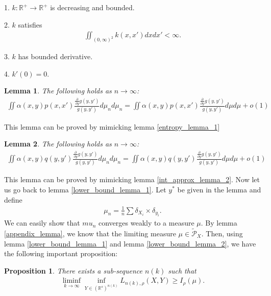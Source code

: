 \documentclass[10pt]{article}
\newtheorem{lemma}{\bf Lemma}
\newtheorem{proposition}{\bf Proposition}
\newenvironment{Proof of lemma}{\noindent{\bf Proof of Lemma}}{\hfill$\Box$\newline}
\newenvironment{Proof of claim}{\noindent{\bf Proof of claim}}{\hfill$\Box$\newline}
\newenvironment{Proof of theorem}{\noindent{\bf Proof of Theorem}}{\hfill\scriptsize{$\Box$}\newline}
\newenvironment{Proof of theorems}{\noindent{\bf Proof of Theorems}}{\hfill$\Box$\newline}
\newenvironment{Proof of proposition}{\noindent{\bf Proof of Proposition}}{\hfill$\Box$\newline}
\newenvironment{Proof of propositions}{\noindent{\bf Proof of Propositions}}{\hfill$\Box$\newline}
\newenvironment{Proof of exercise}{\noindent{\it Proof of Exercise:}}{\hfill$\Box$}
\numberwithin{equation}{section}
\begin{document}
1. $k: \mathbb{R}^+ \to \mathbb{R}^+$ is decreasing and bounded.

2. $k$ satisfies
\begin{align}
    \iint_{(0,\infty)^2} k(x,x') dxdx' < \infty.
\end{align}

3. $k$ has bounded derivative.

4. $k'(0) = 0$.
\begin{lemma} \label{appendix_lemma_1}
    The following holds as $n \to \infty$:
    \begin{align}
        \iint \alpha(x,y)p(x,x') \frac{\frac{\partial}{\partial y}g(y,y')}{g(y,y')} d\mu_n d\mu_n = \iint \alpha(x,y)p(x,x') \frac{\frac{\partial}{\partial y}g(y,y')}{g(y,y')} d\mu d\mu + o(1)
    \end{align}
\end{lemma}
This lemma can be proved by mimicking lemma \ref{entropy_lemma_1}
\begin{lemma} \label{appendix_lemma_2}
    The following holds as $n \to \infty$:
    \begin{align}
        \iint \alpha(x,y)q(y,y') \frac{\frac{\partial}{\partial y}g(y,y')}{g(y,y')} d\mu_n d\mu_n = \iint \alpha(x,y)q(y,y') \frac{\frac{\partial}{\partial y}g(y,y')}{g(y,y')} d\mu d\mu + o(1)
    \end{align}
\end{lemma}
This lemma can be proved by mimicking lemma \ref{int_approx_lemma_2}. Now let us go back to lemma \ref{lower_bound_lemma_1}. Let $y^*$ be given in the lemma and define
\begin{align}
    \mu_n = \frac{1}{n} \sum \delta_{X_i} \times \delta_{y_i}.
\end{align}
We can easily show that $mu_n$ converges weakly to a measure $\mu$. By lemma \ref{appendix_lemma}, we know that the limiting measure $\mu \in \tilde{\mathcal{P}}_X$. Then, using lemma \ref{lower_bound_lemma_1} and lemma \ref{lower_bound_lemma_2}, we have the following important proposition:
\begin{proposition} \label{lower_bound_prop}
    There exists a sub-sequence $n(k)$ such that
    \begin{align}
        \liminf_{k \to \infty} \inf_{Y \in (\mathbb{R}^s)^{n(k)}} L_{n(k),\rho}(X,Y) \geq I_{\rho}(\mu).
    \end{align}
\end{proposition}
\end{document}
